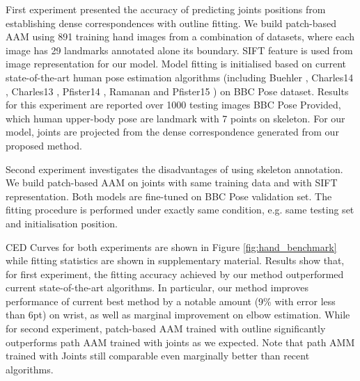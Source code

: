 First experiment presented the accuracy of predicting joints positions from establishing dense correspondences with outline fitting. We build patch-based AAM using 891 training hand images from a combination of datasets, where each image has 29 landmarks annotated alone its boundary. SIFT \cite{PoseletsICCV09} feature is used from image representation for our model. Model fitting is initialised based on current state-of-the-art human pose estimation algorithms (including Buehler \cite{buehler2011upper}, Charles14 \cite{charles2014upper}, Charles13 \cite{charles2013domain}, Pfister14 \cite{pfister2015deep}, Ramanan \cite{yang2013articulated} and Pfister15 \cite{pfister2015flowing}) on BBC Pose \cite{pfister2015flowing} dataset. Results for this experiment are reported over 1000 testing images BBC Pose Provided, which human upper-body pose are landmark with 7 points on skeleton. For our model, joints are projected from the dense correspondence generated from our proposed method.

Second experiment investigates the disadvantages of using skeleton annotation. We build patch-based AAM on joints with same training data and with SIFT representation. Both models are fine-tuned on BBC Pose validation set. The fitting procedure is performed under exactly same condition, e.g. same testing set and initialisation position. 

CED Curves for both experiments are shown in Figure \ref{fig:hand_benchmark} while fitting statistics are shown in supplementary material. Results show that, for first experiment, the fitting accuracy achieved by our method outperformed current state-of-the-art algorithms. In particular, our method improves performance of current best method \cite{pfister2015flowing} by a notable amount (9\% with error less than 6pt) on wrist, as well as marginal improvement on elbow estimation. While for second experiment, patch-based AAM trained with outline significantly outperforms path AAM trained with joints as we expected. Note that path AMM trained with Joints still comparable even marginally better than recent algorithms.




